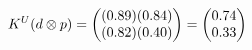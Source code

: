 \documentclass[preview]{standalone}
\begin{document}
\begin{align*}
\special{dvisvgm:raw <g id='unique000'>}K^U(d \otimes p) = \begin{pmatrix} (0.89)(0.84) \\ (0.82)(0.40) \end{pmatrix} = \begin{pmatrix} 0.74 \\ 0.33 \end{pmatrix}\special{dvisvgm:raw </g>}
\end{align*}
\end{document}
